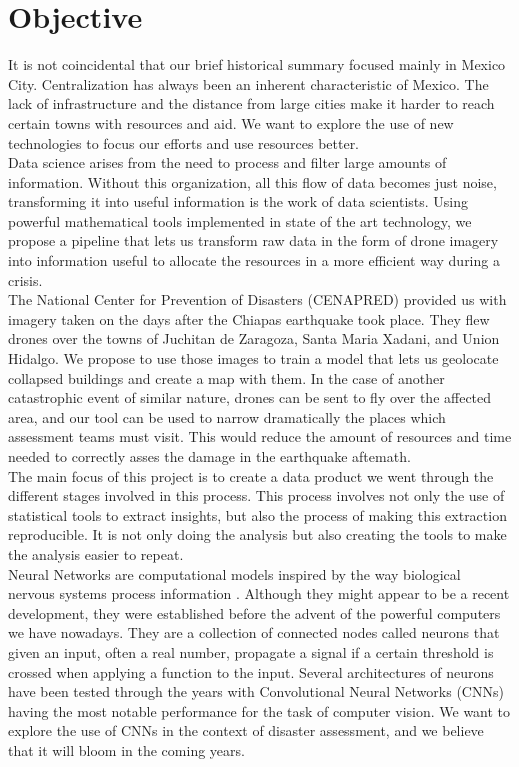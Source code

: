 \section{Objective}

It is not coincidental that our brief historical summary focused mainly in Mexico City. Centralization has always been an inherent characteristic of Mexico. The lack of infrastructure and the distance from large cities make it harder to reach certain towns with resources and aid. We want to explore the use of new technologies to focus our efforts and use resources better.\\

Data science arises from the need to process and filter large amounts of information. Without this organization, all this flow of data becomes just noise, transforming it into useful information is the work of data scientists. Using powerful mathematical tools implemented in state of the art technology, we propose a pipeline that lets us transform raw data in the form of drone imagery into information useful to allocate the resources in a more efficient way during a crisis.\\

The National Center for Prevention of Disasters (CENAPRED) provided us with imagery taken on the days after the Chiapas earthquake took place. They flew drones over the towns of Juchitan de Zaragoza, Santa Maria Xadani, and Union Hidalgo. We propose to use those images to train a model that lets us geolocate collapsed buildings and create a map with them. In the case of another catastrophic event of similar nature, drones can be sent to fly over the affected area, and our tool can be used to narrow dramatically the places which assessment teams must visit. This would reduce the amount of resources and time needed to correctly asses the damage in the earthquake aftemath.\\

The main focus of this project is to create a data product we went through the different stages involved in this process. This process involves not only the use of statistical tools to extract insights, but also the process of making this extraction reproducible. It is not only doing the analysis but also creating the tools to make the analysis easier to repeat.\\

Neural Networks are computational models inspired by the way biological nervous systems process information \cite{aleksander1990introduction}. Although they might appear to be a recent development, they were established before the advent of the powerful computers we have nowadays. They are a collection of connected nodes called neurons that given an input, often a real number, propagate a signal if a certain threshold is crossed when applying a function to the input. Several architectures of neurons have been tested through the years with Convolutional Neural Networks (CNNs) having the most notable performance for the task of computer vision. We want to explore the use of CNNs in the context of disaster assessment, and we believe that it will bloom in the coming years.\\

